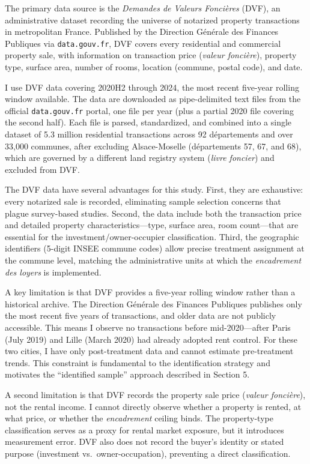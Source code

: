 \documentclass[12pt]{article}
\begin{document}
The primary data source is the \emph{Demandes de Valeurs Fonci\`eres} (DVF), an administrative dataset recording the universe of notarized property transactions in metropolitan France. Published by the Direction G\'en\'erale des Finances Publiques via \texttt{data.gouv.fr}, DVF covers every residential and commercial property sale, with information on transaction price (\emph{valeur fonci\`ere}), property type, surface area, number of rooms, location (commune, postal code), and date.

I use DVF data covering 2020H2 through 2024, the most recent five-year rolling window available. The data are downloaded as pipe-delimited text files from the official \texttt{data.gouv.fr} portal, one file per year (plus a partial 2020 file covering the second half). Each file is parsed, standardized, and combined into a single dataset of 5.3 million residential transactions across 92 d\'epartements and over 33,000 communes, after excluding Alsace-Moselle (d\'epartements 57, 67, and 68), which are governed by a different land registry system (\emph{livre foncier}) and excluded from DVF.

The DVF data have several advantages for this study. First, they are exhaustive: every notarized sale is recorded, eliminating sample selection concerns that plague survey-based studies. Second, the data include both the transaction price and detailed property characteristics---type, surface area, room count---that are essential for the investment/owner-occupier classification. Third, the geographic identifiers (5-digit INSEE commune codes) allow precise treatment assignment at the commune level, matching the administrative units at which the \emph{encadrement des loyers} is implemented.

A key limitation is that DVF provides a five-year rolling window rather than a historical archive. The Direction G\'en\'erale des Finances Publiques publishes only the most recent five years of transactions, and older data are not publicly accessible. This means I observe no transactions before mid-2020---after Paris (July 2019) and Lille (March 2020) had already adopted rent control. For these two cities, I have only post-treatment data and cannot estimate pre-treatment trends. This constraint is fundamental to the identification strategy and motivates the ``identified sample'' approach described in Section 5.

A second limitation is that DVF records the property sale price (\emph{valeur fonci\`ere}), not the rental income. I cannot directly observe whether a property is rented, at what price, or whether the \emph{encadrement} ceiling binds. The property-type classification serves as a proxy for rental market exposure, but it introduces measurement error. DVF also does not record the buyer's identity or stated purpose (investment vs.\ owner-occupation), preventing a direct classification.
\end{document}
